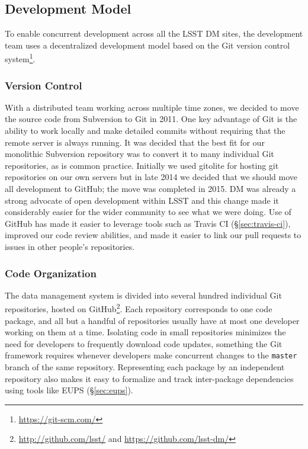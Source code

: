 \subsection{Development Model}\label{sec:development}

To enable concurrent development across all the LSST DM sites, the development team uses a decentralized development model based on the Git version control system\footnote{\url{https://git-scm.com/}}.

\subsubsection{Version Control}\label{sec:git}\label{sec:subversion}

With a distributed team working across multiple time zones, we decided to  move the  source code from Subversion to Git in 2011.
One key advantage of Git  is the ability to work locally and make detailed commits without requiring that the remote server is always running.
It was decided that the best fit for our monolithic Subversion repository was to convert it to many individual Git repositories, as is common practice.
Initially we used gitolite for hosting git repositories on our own servers but in late 2014 we decided that we should move all development to GitHub\cite{Document-17187}; the move was completed in 2015.
DM was already a strong advocate of open development within LSST and this change made it considerably easier for the wider community to see what we were doing.
Use of GitHub  has made it easier to leverage tools such as Travis CI (\S\ref{sec:travis-ci}), improved our code review abilities, and made it easier to link our pull requests to issues in other people's repositories.

\subsubsection{Code Organization}\label{sec:git_repositories}

The data management system is divided into several hundred individual Git repositories, hosted on GitHub\footnote{\url{http://github.com/lsst/} and \url{https://github.com/lsst-dm/}}.
Each repository corresponds to one code package, and all but a handful of repositories usually have at most one developer working on them at a time.
Isolating code in small repositories minimizes the need for developers to frequently download code updates, something the Git framework requires whenever developers make concurrent changes to the \texttt{master} branch of the same repository.
Representing each package by an independent repository also makes it easy to formalize and track inter-package dependencies using tools like EUPS (\S\ref{sec:eups}).

